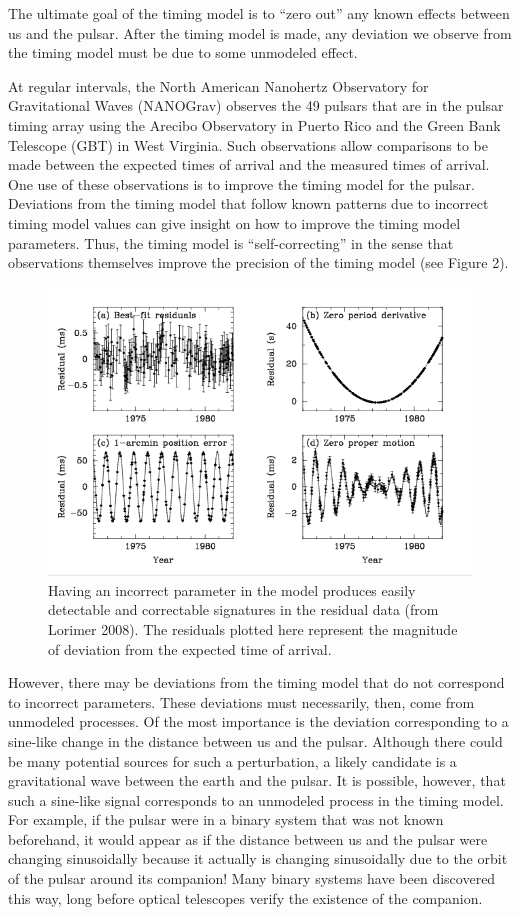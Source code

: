 \documentclass[12pt]{article}
\begin{document}
The ultimate goal of the timing model is to ``zero out'' any known effects between
us and the pulsar. After the timing model is made, any deviation we observe from
the timing model must be due to some unmodeled effect.

At regular intervals, the North American Nanohertz Observatory for Gravitational
Waves (NANOGrav) observes the 49 pulsars that are in the pulsar timing array
using the Arecibo Observatory in Puerto Rico and the Green Bank Telescope (GBT)
in West Virginia. Such observations allow comparisons to be made between the
expected times of arrival and the measured times of arrival. One use of these
observations is to improve the timing model for the pulsar. Deviations from the
timing model that follow known patterns due to incorrect timing model values can
give insight on how to improve the timing model parameters.  Thus, the timing
model is ``self-correcting'' in the sense that observations themselves improve
the precision of the timing model (see Figure 2).

\begin{figure}
\caption{Having an incorrect parameter in the model produces easily detectable
and correctable signatures in the residual data (from Lorimer 2008). The
    residuals plotted here represent the magnitude of deviation from the
    expected time of arrival.}
\includegraphics[width=\textwidth]{./figures/bad_timing.png}
\end{figure}


However, there may be deviations from the timing model that do not correspond to
incorrect parameters. These deviations must necessarily, then, come from
unmodeled processes. Of the most importance is the deviation corresponding to a
sine-like change in the distance between us and the pulsar. Although there could
be many potential sources for such a perturbation, a likely candidate is a
gravitational wave between the earth and the pulsar. It is possible, however,
that such a sine-like signal corresponds to an unmodeled process in the timing
model. For example, if the pulsar were in a binary system that was not known
beforehand, it would appear as if the distance between us and the pulsar were
changing sinusoidally because it actually is changing sinusoidally due to the
orbit of the pulsar around its companion! Many binary systems have been
discovered this way, long before optical telescopes verify the existence of
the companion.
\end{document}
